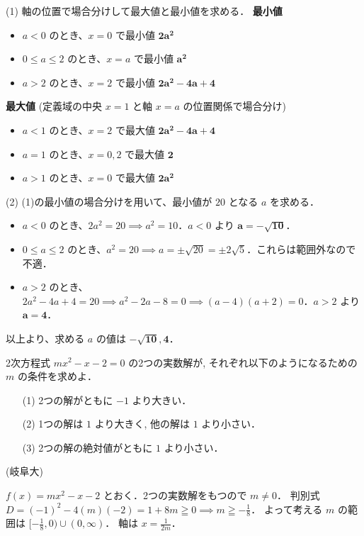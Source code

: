 \documentclass[a4paper,11pt]{ltjsarticle}
\begin{document}
(1) 軸の位置で場合分けして最大値と最小値を求める．
\textbf{最小値}
\begin{itemize}
    \item $a<0$ のとき、$x=0$ で最小値 $\boldsymbol{2a^2}$
    \item $0 \le a \le 2$ のとき、$x=a$ で最小値 $\boldsymbol{a^2}$
    \item $a>2$ のとき、$x=2$ で最小値 $\boldsymbol{2a^2-4a+4}$
\end{itemize}
\textbf{最大値} (定義域の中央 $x=1$ と軸 $x=a$ の位置関係で場合分け)
\begin{itemize}
    \item $a<1$ のとき、$x=2$ で最大値 $\boldsymbol{2a^2-4a+4}$
    \item $a=1$ のとき、$x=0,2$ で最大値 $\boldsymbol{2}$
    \item $a>1$ のとき、$x=0$ で最大値 $\boldsymbol{2a^2}$
\end{itemize}

(2) (1)の最小値の場合分けを用いて、最小値が $20$ となる $a$ を求める．
\begin{itemize}
    \item $a<0$ のとき、$2a^2=20 \implies a^2=10$．$a<0$ より $\boldsymbol{a=-\sqrt{10}}$．
    \item $0 \le a \le 2$ のとき、$a^2=20 \implies a=\pm\sqrt{20}=\pm2\sqrt{5}$．これらは範囲外なので不適．
    \item $a>2$ のとき、$2a^2-4a+4=20 \implies a^2-2a-8=0 \implies (a-4)(a+2)=0$．$a>2$ より $\boldsymbol{a=4}$．
\end{itemize}
以上より、求める $a$ の値は $\boldsymbol{-\sqrt{10}, 4}$．

\begin{toi}
 2次方程式 $mx^2 - x - 2 = 0$ の2つの実数解が, それぞれ以下のようになるための $m$ の条件を求めよ．
\begin{enumerate}
    \item[(1)] 2つの解がともに $-1$ より大きい．
    \item[(2)] 1つの解は $1$ より大きく, 他の解は $1$ より小さい．
    \item[(3)] 2つの解の絶対値がともに $1$ より小さい．
\end{enumerate}
\hfill (岐阜大)
\end{toi}
\ans 
$f(x)=mx^2-x-2$ とおく．2つの実数解をもつので $m \ne 0$．
判別式 $D=(-1)^2-4(m)(-2)=1+8m \geqq 0 \implies m \geqq -\frac{1}{8}$．
よって考える $m$ の範囲は $[-\frac{1}{8}, 0) \cup (0, \infty)$．
軸は $x=\frac{1}{2m}$．
\end{document}
